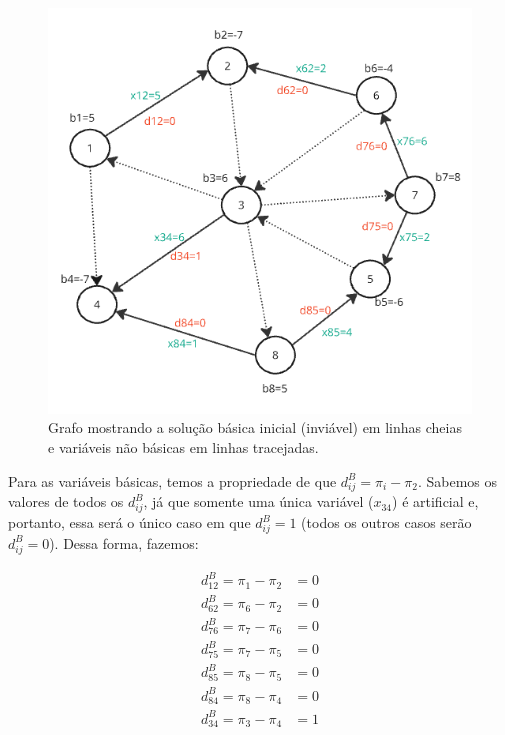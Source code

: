 \documentclass{article}
\begin{document}
\begin{figure}[H]
    \centering
    \includegraphics[scale=0.7]{images/grafo-res-1.png}
    \caption{Grafo mostrando a solução básica inicial (inviável) em linhas cheias e variáveis não básicas em linhas tracejadas.}
\end{figure}


Para as variáveis básicas, temos a propriedade de que $d_{ij}^{B} = \pi_{i} - \pi_{2}$.
Sabemos os valores de todos os $d_{ij}^{B}$, já que somente uma única variável ($x_{34}$) é artificial e, portanto, essa será o único caso em que $d_{ij}^{B} = 1$ (todos os outros casos serão $d_{ij}^{B} = 0$).
Dessa forma, fazemos:

\begin{align*}
    d_{12}^{B} = \pi_{1} - \pi_{2} &= 0 \\
    d_{62}^{B} = \pi_{6} - \pi_{2} &= 0 \\
    d_{76}^{B} = \pi_{7} - \pi_{6} &= 0 \\
    d_{75}^{B} = \pi_{7} - \pi_{5} &= 0 \\
    d_{85}^{B} = \pi_{8} - \pi_{5} &= 0 \\
    d_{84}^{B} = \pi_{8} - \pi_{4} &= 0 \\
    d_{34}^{B} = \pi_{3} - \pi_{4} &= 1 \\
\end{align*}
\end{document}
